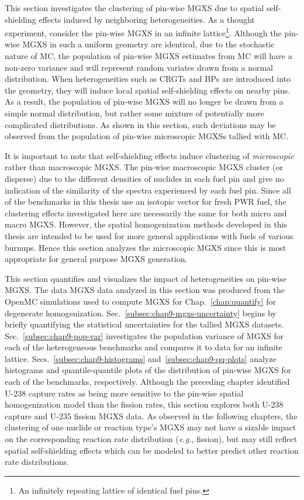 This section investigates the clustering of pin-wise \ac{MGXS} due to spatial self-shielding effects induced by neighboring heterogeneities. As a thought experiment, consider the pin-wise \ac{MGXS} in an infinite lattice\footnote{An infinitely repeating lattice of identical fuel pins.}. Although the pin-wise \ac{MGXS} in such a uniform geometry are identical, due to the stochastic nature of \ac{MC}, the population of pin-wise \ac{MGXS} estimates from \ac{MC} will have a non-zero variance and will represent random variates drawn from a normal distribution. When heterogeneities such as \acp{CRGT} and \acp{BP} are introduced into the geometry, they will induce local spatial self-shielding effects on nearby pins. As a result, the population of pin-wise \ac{MGXS} will no longer be drawn from a simple normal distribution, but rather some mixture of potentially more complicated distributions. As shown in this section, such deviations may be observed from the population of pin-wise microscopic \acp{MGXS} tallied with \ac{MC}.

It is important to note that self-shielding effects induce clustering of \textit{microscopic} rather than macroscopic \ac{MGXS}. The pin-wise macroscopic \ac{MGXS} cluster (or disperse) due to the different densities of nuclides in each fuel pin and give no indication of the similarity of the spectra experienced by each fuel pin. Since all of the benchmarks in this thesis use an isotopic vector for fresh \ac{PWR} fuel, the clustering effects investigated here are necessarily the same for both micro and macro \ac{MGXS}. However, the spatial homogenization methods developed in this thesis are intended to be used for more general applications with fuels of various burnups. Hence this section analyzes the microscopic \ac{MGXS} since this is most appropriate for general purpose \ac{MGXS} generation.

This section quantifies and visualizes the impact of heterogeneities on pin-wise \ac{MGXS}. The data \ac{MGXS} data analyzed in this section was produced from the OpenMC simulations used to compute \ac{MGXS} for Chap.~\ref{chap:quantify} for degenerate homogenization. Sec.~\ref{subsec:chap9-mgxs-uncertainty} begins by briefly quantifying the statistical uncertainties for the tallied \ac{MGXS} datasets. Sec.~\ref{subsec:chap9-pop-var} investigates the population variance of \ac{MGXS} for each of the heterogeneous benchmarks and compares it to data for an infinite lattice. Secs.~\ref{subsec:chap9-histograms} and~\ref{subsec:chap9-qq-plots} analyze histograms and quantile-quantile plots of the distribution of pin-wise \ac{MGXS} for each of the benchmarks, respectively. Although the preceding chapter identified U-238 capture rates as being more sensitive to the pin-wise spatial homogenization model than the fission rates, this section explores both U-238 capture and U-235 fission \ac{MGXS} data. As observed in the following chapters, the clustering of one nuclide or reaction type's \ac{MGXS} may not have a sizable impact on the corresponding reaction rate distribution (\textit{e.g.}, fission), but may still reflect spatial self-shielding effects which can be modeled to better predict other reaction rate distributions.

